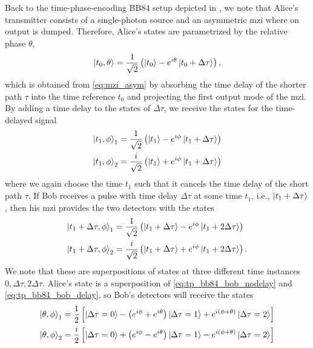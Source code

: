 Back to the time-phase-encoding BB84 setup depicted in , we note that Alice's transmitter consists of a single-photon source and an asymmetric \gls{mzi} where on output is dumped.
Therefore, Alice's states are parametrized by the relative phase $\theta$,
\begin{equation}
	\ket{t_0,\theta}
	=
	\frac{1}{\sqrt{2}}
	\left(
		\ket{t_0}
		-
		e^{i\theta}
		\ket{t_0+\Delta\tau}
	\right)
	,
\end{equation}
which is obtained from \cref{eq:mzi_asym} by absorbing the time delay of the shorter path $\tau$ into the time reference $t_0$ and projecting the first output mode of the \gls{mzi}.
By adding a time delay to the states of $\Delta\tau$, we receive the states for the time-delayed signal
\begin{align}
	\ket{t_1,\phi}_1
	&=
	\frac{1}{\sqrt{2}}
	\left(
		\ket{t_1}
		-
		e^{i\phi}
		\ket{t_1+\Delta\tau}
	\right)
	\\
	\ket{t_1,\phi}_2
	&=
	\frac{i}{\sqrt{2}}
	\left(
		\ket{t_1}
		+
		e^{i\phi}
		\ket{t_1+\Delta\tau}
	\right)
	\label{eq:tp_bb84_bob_nodelay}
\end{align}
where we again choose the time $t_1$ such that it cancels the time delay of the short path $\tau$.
If Bob receives a pulse with time delay $\Delta\tau$ at some time $t_1$, i.e., $\ket{t_1+\Delta\tau}$, then his \gls{mzi} provides the two detectors with the states
\begin{align}
	\ket{t_1+\Delta\tau,\phi}_1
	&=
	\frac{1}{\sqrt{2}}
	\left(
		\ket{t_1+\Delta\tau}
		-
		e^{i\phi}
		\ket{t_1+2\Delta\tau}
	\right)
	\\
	\ket{t_1+\Delta\tau,\phi}_2
	&=
	\frac{i}{\sqrt{2}}
	\left(
		\ket{t_1+\Delta\tau}
		+
		e^{i\phi}
		\ket{t_1+2\Delta\tau}
	\right)
	.
	\label{eq:tp_bb84_bob_delay}
\end{align}
We note that these are superpositions of states at three different time instances $0,\Delta\tau,2\Delta\tau$.
Alice's state is a superposition of \cref{eq:tp_bb84_bob_nodelay} and \cref{eq:tp_bb84_bob_delay}, so Bob's detectors will receive the states
\begin{align}
	\ket{\theta,\phi}_1
	&=
	\frac{1}{2}
	\left[
		\ket{\Delta\tau=0}
		-
		\left(
			e^{i\phi}
			+
			e^{i\theta}
		\right)
		\ket{\Delta\tau=1}
		+
		e^{i(\phi+\theta)}
		\ket{\Delta\tau=2}
	\right]
	\\
	\ket{\theta,\phi}_2
	&=
	\frac{i}{2}
	\left[
		\ket{\Delta\tau=0}
		+
		\left(
			e^{i\phi}
			-
			e^{i\theta}
		\right)
		\ket{\Delta\tau=1}
		-
		e^{i(\phi+\theta)}
		\ket{\Delta\tau=2}
	\right]
	\label{eq:tp_bb84_bob}
\end{align}

